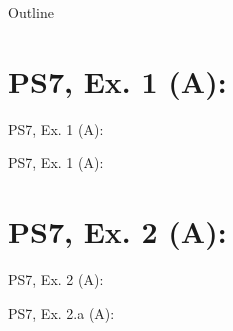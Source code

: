 

\maketitle

\begin{frame}{Outline}
    \tableofcontents
\end{frame}



\section{PS7, Ex. 1 (A): }

\begin{frame}{PS7, Ex. 1 (A): }
  \begin{multicols}{2}
    \vfill\null \columnbreak
    \vfill\null
  \end{multicols}
\end{frame}

\begin{frame}{PS7, Ex. 1 (A): }
  \begin{multicols}{2}
    \vfill\null \columnbreak
    \vfill\null
  \end{multicols}
\end{frame}



\section{PS7, Ex. 2 (A): }

\begin{frame}{PS7, Ex. 2 (A): }
  \begin{multicols}{2}
    \vfill\null \columnbreak
    \vfill\null
  \end{multicols}
\end{frame}

\begin{frame}{PS7, Ex. 2.a (A): }
  \begin{multicols}{2}
    \vfill\null \columnbreak
    \vfill\null
  \end{multicols}
\end{frame}



